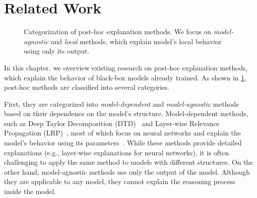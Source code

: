 \documentclass[11pt]{article}
\begin{document}
\section{Related Work}
\begin{figure}[tbp]
  \centering
  \def\w{2.2}
  \def\ww{4.4}
  \def\h{0.7}
  \def\hh{1.4}
  \def\hhh{2.1}
  \def\hhhh{2.8}
  \caption{%
    Categorization of post-hoc explanation methods.
    We focus on \emph{model-agnostic} and \emph{local} methods,
    which explain model's local behavior using only its output.
  }\label{fig:post-hoc}
\end{figure}
In this chapter,
we overview existing research on post-hoc explanation methods,
which explain the behavior of black-box models already trained.
As shown in \cref{fig:post-hoc},
post-hoc methods are classified into several categories.

First, they are categorized into \emph{model-dependent} and \emph{model-agnostic} methods
based on their dependence on the model's structure.
Model-dependent methods,
such as Deep Taylor Decomposition (DTD)~\cite{montavon2017explaining}
and Layer-wise Relevance Propagation (LRP)~\cite{bach2015pixel},
most of which focus on neural networks and
explain the model's behavior using its parameters~\cite{samek2021explaining}.
While these methods provide detailed explanations
(e.g., layer-wise explanations for neural networks),
it is often challenging
to apply the same method to models with different structures.
On the other hand,
model-agnostic methods use only the output of the model.
Although they are applicable to any model,
they cannot explain the reasoning process inside the model.
\end{document}
